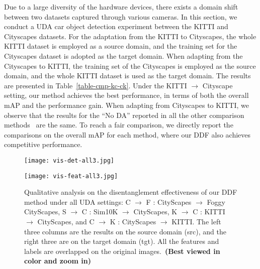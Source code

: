 \documentclass[journal]{IEEEtran}
\begin{document}
Due to a large diversity of the hardware devices, there exists a domain shift between two datasets captured through various cameras. In this section, we conduct a UDA car object detection experiment between the KITTI and Cityscapes datasets. For the adaptation from the KITTI to Cityscapes, the whole KITTI dataset is employed as a source domain, and the training set for the Cityscapes dataset is adopted as the target domain. When adapting from the Cityscapes to KITTI, the training set of the Cityscapes is employed as the source domain, and the whole KITTI dataset is used as the target domain. The results are presented in Table~\ref{table-cmp-kc-ck}. Under the KITTI $\to$ Cityscape setting, our method achieves the best performance, in terms of both the overall mAP and the performance gain. When adapting from Cityscapes to KITTI, we observe that the results for the ``No DA'' reported in all the other comparison methods~\cite{chen2018domain,he2019multi,he2020domain,vs2021mega} are the same. To reach a fair comparison, we directly report the comparisons on the overall mAP for each method, where our DDF also achieves competitive performance. 

{}


\begin{figure*}[htbp]
\centering
\texttt{[image: vis-det-all3.jpg]}

\caption{{} }
\label{fig-vis-det-all}
\end{figure*}

\begin{figure*}[htbp]
\centering
\texttt{[image: vis-feat-all3.jpg]}

\caption{Qualitative analysis on the disentanglement effectiveness of our DDF method under all UDA settings: C $\to$ F : CityScapes $\to$ Foggy CityScapes, S $\to$ C : Sim10K $\to$ CityScapes, K $\to$ C : KITTI $\to$ CityScapes, and C $\to$ K : CityScapes $\to$ KITTI. The left three columns are the results on the source domain (src), and the right three are on the target domain (tgt). All the features and labels are overlapped on the original images.~\textbf{(Best viewed in color and zoom in)} }
\label{fig-vis-feat}
\end{figure*}
\end{document}
